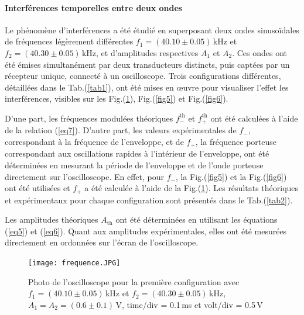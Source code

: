 \documentclass[a4paper, 12pt,oneside]{article}
\begin{document}
\paragraph{Interférences temporelles entre deux ondes}

Le phénomène d’interférences a été étudié en superposant deux ondes sinusoïdales de fréquences légèrement différentes $f_1 = (40.10 \pm 0.05)$\,kHz et $f_2 = (40.30 \pm 0.05)$\,kHz, et d’amplitudes respectives $A_1$ et $A_2$. Ces ondes ont été émises simultanément par deux transducteurs distincts, puis captées par un récepteur unique, connecté à un oscilloscope. Trois configurations différentes, détaillées dans le Tab.(\ref{tab1}), ont été mises en œuvre pour visualiser l’effet les interférences, visibles sur les Fig.(\ref{fig4}), Fig.(\ref{fig5}) et Fig.(\ref{fig6}).

D'une part, les fréquences modulées théoriques $f_-^{\text{th}}$ et $f_+^{\text{th}}$ ont été calculées à l’aide de la relation (\ref{eq7}). D'autre part, les valeurs expérimentales de $f_-$, correspondant à la fréquence de l’enveloppe, et de $f_+$, la fréquence porteuse correspondant aux oscillations rapides à l’intérieur de l’enveloppe, ont été déterminées en mesurant la période de l’enveloppe et de l'onde porteuse directement sur l’oscilloscope. En effet, pour $f_-$, la Fig.(\ref{fig5}) et la  Fig.(\ref{fig6}) ont été utilisées et $f_+$ a été calculée à l'aide de la Fig.(\ref{fig4}).  Les résultats théoriques et expérimentaux pour chaque configuration sont présentés dans le Tab.(\ref{tab2}).

Les amplitudes théoriques $A_{\text{th}}$ ont été déterminées en utilisant les équations  (\ref{eq5}) et (\ref{eq6}). Quant aux amplitudes expérimentales, elles ont été mesurées directement en ordonnées sur l’écran de l’oscilloscope.

\begin{figure}[H]
    \centering
    \texttt{[image: frequence.JPG]}
    \captionsetup{justification=centering}
    \caption{Photo de l'oscilloscope pour la première configuration avec $f_1=(40.10\pm0.05)$\,kHz et $f_2=(40.30\pm0.05)$\,kHz, $A_1=A_2=(0.6\pm0.1)$\,V, time/div = 0.1\,ms et volt/div = 0.5\,V}
    \label{fig4}
\end{figure}
\end{document}
